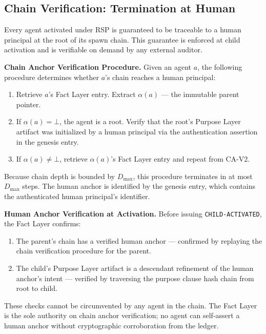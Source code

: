 \documentclass[12pt]{article}
\begin{document}
\subsection{Chain Verification: Termination at Human}

Every agent activated under RSP is guaranteed to be traceable to a human principal at the root of its spawn chain. This guarantee is enforced at child activation and is verifiable on demand by any external auditor.

\bigskip
\noindent\textbf{Chain Anchor Verification Procedure.} Given an agent $a$, the following procedure determines whether $a$'s chain reaches a human principal:

\begin{enumerate}
  \item[(CA-V1)] Retrieve $a$'s Fact Layer entry. Extract $\alpha(a)$ — the immutable parent pointer.

  \item[(CA-V2)] If $\alpha(a) = \bot$, the agent is a root. Verify that the root's Purpose Layer artifact was initialized by a human principal via the authentication assertion in the genesis entry.

  \item[(CA-V3)] If $\alpha(a) \neq \bot$, retrieve $\alpha(a)$'s Fact Layer entry and repeat from CA-V2.
\end{enumerate}

Because chain depth is bounded by $D_{\max}$, this procedure terminates in at most $D_{\max}$ steps. The human anchor is identified by the genesis entry, which contains the authenticated human principal's identifier.

\bigskip
\noindent\textbf{Human Anchor Verification at Activation.} Before issuing \texttt{CHILD-ACTIVATED}, the Fact Layer confirms:

\begin{enumerate}
  \item[(HAV-1)] The parent's chain has a verified human anchor — confirmed by replaying the chain verification procedure for the parent.

  \item[(HAV-2)] The child's Purpose Layer artifact is a descendant refinement of the human anchor's intent — verified by traversing the purpose clause hash chain from root to child.
\end{enumerate}

These checks cannot be circumvented by any agent in the chain. The Fact Layer is the sole authority on chain anchor verification; no agent can self-assert a human anchor without cryptographic corroboration from the ledger.
\end{document}
